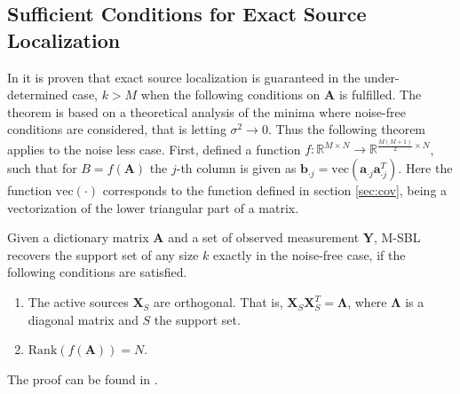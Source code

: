 \subsection{Sufficient Conditions for Exact Source Localization}
In \cite{Balkan2014} it is proven that exact source localization is guaranteed in the under-determined case, $k > M$ when the following conditions on $\mathbf{A}$ is fulfilled.
The theorem is based on a theoretical analysis of the minima where noise-free conditions are considered, that is letting $\sigma^2 \rightarrow 0$. Thus the following theorem applies to the noise less case.   
First, defined a function $f:\mathbb{R}^{M \times N} \rightarrow \mathbb{R}^{\frac{M(M+1)}{2}\times N}$, such that for $B = f(\mathbf{A})$ the $j$-th column is given as $\mathbf{b}_{\cdot j} = \text{vec}(\mathbf{a}_{\cdot j}\mathbf{a}_{\cdot j}^T)$. Here the function $\text{vec}(\cdot)$ corresponds to the function defined in section \ref{sec:cov}, being a vectorization of the lower triangular part of a matrix.	
\begin{theorem}
Given a dictionary matrix $\mathbf{A}$ and a set of observed measurement $\mathbf{Y}$, M-SBL recovers the support set of any size $k$ exactly in the noise-free case, if the following conditions are satisfied. 
\begin{enumerate}
\item The active sources $\mathbf{X}_S$ are orthogonal. That is, $\mathbf{X}_S \mathbf{X}_S^T = \boldsymbol{\Lambda}$, where $\boldsymbol{\Lambda}$ is a diagonal matrix and $S$ the support set.
\item $\text{Rank}(f(\mathbf{A}))= N$.
\end{enumerate}
The proof can be found in \cite[p. 16]{Balkan2014}.



\end{theorem}  


